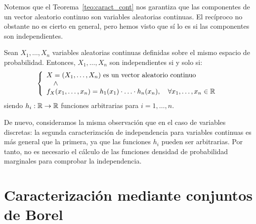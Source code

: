 Notemos que el Teorema~\ref{teo:caract_cont} nos garantiza que las componentes de un vector aleatorio continuo son variables aleatorias continuas. El recíproco no obstante no es cierto en general, pero hemos visto que sí lo es si las componentes son independientes.

\begin{prop}
    Sean $X_1, \ldots, X_n$ variables aleatorias continuas definidas sobre el mismo espacio de probabilidad. Entonces, $X_1, \ldots, X_n$ son independientes si y solo si:
    \[
        \left\{
            \begin{array}{l}
                X=(X_1, \ldots, X_n) \text{ es un vector aleatorio continuo} \\
                \quad \land \\
                f_X(x_1, \ldots, x_n) = h_1(x_1) \cdot \ldots \cdot h_n(x_n), \quad \forall x_1, \ldots, x_n \in \mathbb{R}
            \end{array}
        \right.
    \]
    siendo $h_i: \mathbb{R} \to \mathbb{R}$ funciones arbitrarias para $i = 1, \ldots, n$.
\end{prop}

\begin{observacion}
    De nuevo, consideramos la misma observación que en el caso de variables discretas: la segunda caracterización de independencia para variables continuas es más general que la primera, ya que las funciones $h_i$ pueden ser arbitrarias. Por tanto, no es necesario el cálculo de las funciones densidad de probabilidad marginales para comprobar la independencia.
\end{observacion}


\section{Caracterización mediante conjuntos de Borel}

